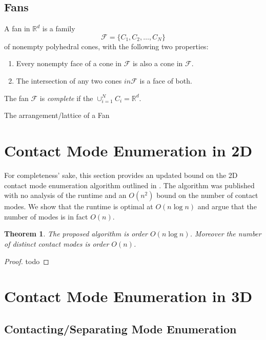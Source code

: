 \documentclass[conference]{IEEEtran}
\newtheorem{theorem}{Theorem}
\begin{document}
\subsection{Fans}
A fan in $\mathbb{R}^d$ is a family 
\begin{equation}
    \mathcal{F} = \{C_1, C_2, \hdots, C_N\}
\end{equation}
of nonempty polyhedral cones, with the following two properties:
\begin{enumerate}
    \item Every nonempty face of a cone in $\mathcal{F}$ is also a cone in $\mathcal{F}$.
    \item The intersection of any two cones $in \mathcal{F}$ is a face of both.
\end{enumerate}
The fan $\mathcal{F}$ is \textit{complete} if the $\cup_{i=1}^N C_i = \mathbb{R}^d$.

The arrangement/lattice of a Fan

\section{Contact Mode Enumeration in 2D}

For completeness' sake, this section provides an updated bound on the 2D contact
mode enumeration algorithm outlined in \citet{Mason}. The algorithm was
published with no analysis of the runtime and an $O(n^2)$ bound on the number of
contact modes. We show that the runtime is optimal at $O(n\log n)$ and argue
that the number of modes is in fact $O(n)$. 

\begin{theorem}
    The proposed algorithm is order $O(n\log n)$. Moreover the number of
    distinct contact modes is order $O(n)$.
\end{theorem}

\begin{proof}
    todo
\end{proof}

\section{Contact Mode Enumeration in 3D}

\subsection{Contacting/Separating Mode Enumeration}
\end{document}
